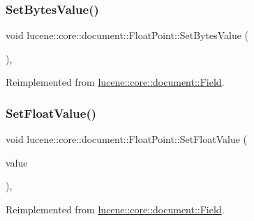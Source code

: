 \subsubsection{\texorpdfstring{Set\+Bytes\+Value()}{SetBytesValue()}}
{\footnotesize\ttfamily void lucene\+::core\+::document\+::\+Float\+Point\+::\+Set\+Bytes\+Value (\begin{DoxyParamCaption}\item[{const \mbox{\hyperlink{classlucene_1_1core_1_1util_1_1BytesRef}{lucene\+::core\+::util\+::\+Bytes\+Ref}} \&}]{ }\end{DoxyParamCaption})\hspace{0.3cm}{\ttfamily [inline]}, {\ttfamily [virtual]}}



Reimplemented from \mbox{\hyperlink{classlucene_1_1core_1_1document_1_1Field_a41d077e63ce6fae8677b8df6b29821bd}{lucene\+::core\+::document\+::\+Field}}.

\mbox{\label{classlucene_1_1core_1_1document_1_1FloatPoint_a4e1f81bce5f905e267a32c4882faf90e}} 
\subsubsection{\texorpdfstring{Set\+Float\+Value()}{SetFloatValue()}}
{\footnotesize\ttfamily void lucene\+::core\+::document\+::\+Float\+Point\+::\+Set\+Float\+Value (\begin{DoxyParamCaption}\item[{const float}]{value }\end{DoxyParamCaption})\hspace{0.3cm}{\ttfamily [inline]}, {\ttfamily [virtual]}}



Reimplemented from \mbox{\hyperlink{classlucene_1_1core_1_1document_1_1Field_aa22291dffcf6a545fd6c24f23fbb8b50}{lucene\+::core\+::document\+::\+Field}}.

\mbox{\label{classlucene_1_1core_1_1document_1_1FloatPoint_a37fb83ede21d310e7bda0cbd072650b4}} 
